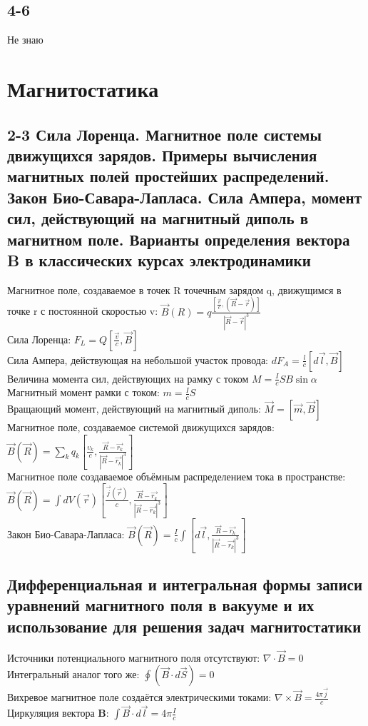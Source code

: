 \documentclass[a4paper,12pt]{article}
\begin{document}
\subsection{4-6}
Не знаю

\section{Магнитостатика}
\subsection{2-3  Сила Лоренца. Магнитное поле системы движущихся зарядов. Примеры вычисления магнитных полей простейших распределений. Закон Био-Савара-Лапласа. Сила Ампера, момент сил, действующий на магнитный диполь в магнитном поле. Варианты определения вектора B в классических курсах электродинамики}
Магнитное поле, создаваемое в точек R точечным зарядом q, движущимся в точке r с постоянной скоростью v: $\vec{B}(R) = q \frac{[\frac{\vec{v}}{c} , (\vec{R} - \vec{r})]}{|\vec{R} - \vec{r}|^3}$\\
Сила Лоренца: $F_L = Q \left[ \frac{\vec{v}}{c}, \vec{B} \right]$\\
Сила Ампера, действующая на небольшой участок провода: $dF_A  = \frac{l}{c}[d \vec{l}, \vec{B}]$\\
Величина момента сил, действующих на рамку с током $M = \frac{I}{c}SB \sin{\alpha}$\\
Магнитный момент рамки с током: $m = \frac{I}{c}S$\\
Вращающий момент, действующий на магнитный диполь: $\vec{M} = [\vec{m}, \vec{B}]$\\
Магнитное поле, создаваемое системой движущихся зарядов: $\vec{B}(\vec{R}) = \sum _k q_k \left[ \frac{v_k}{c}, \frac{\vec{R} - \vec{r_k}}{|\vec{R} - \vec{r_k}|^3} \right]$\\
Магнитное поле создаваемое объёмным распределением тока в пространстве: $\vec{B}(\vec{R}) = \int dV(\vec{r}) \left[ \frac{\vec{j}(\vec{r})}{c}, \frac{\vec{R} - \vec{r_k}}{|\vec{R} - \vec{r_k}|^3} \right]$\\
Закон Био-Савара-Лапласа: $\vec{B}(\vec{R}) = \frac{I}{c}\int \left[ d\vec{l}, \frac{\vec{R} - \vec{r_k}}{|\vec{R} - \vec{r_k}|^3} \right]$\\

\subsection{Дифференциальная и интегральная формы записи уравнений магнитного поля в вакууме и их использование для решения задач  магнитостатики}
Источники потенциального магнитного поля отсутствуют: $\nabla \cdot \vec{B} = 0$\\
Интегральный аналог того же: $\oint (\vec{B} \cdot d\vec{S}) = 0$\\
Вихревое магнитное поле создаётся электрическими токами: $\nabla \times \vec{B} = \frac{4 \pi \vec{j}}{c}$\\
Циркуляция вектора \textbf{B}: $\int \vec{B} \cdot d\vec{l} = 4 \pi \frac{I}{c}$\\
\end{document}
